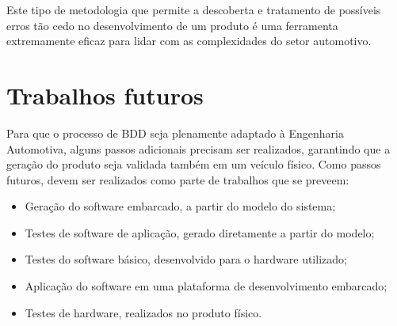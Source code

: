 Este tipo de metodologia que permite a descoberta e tratamento de possíveis erros tão cedo no desenvolvimento de um produto é uma ferramenta extremamente eficaz para 
lidar com as complexidades do setor automotivo.

\section{Trabalhos futuros}

Para que o processo de BDD seja plenamente adaptado à Engenharia Automotiva, alguns passos adicionais precisam ser realizados, garantindo que a geração do 
produto seja validada também em um veículo físico. 
Como passos futuros, devem ser realizados como parte de trabalhos que se preveem:

\begin{itemize} 
    \item Geração do software embarcado, a partir do modelo do sistema;
    \item Testes de software de aplicação, gerado diretamente a partir do modelo;
    \item Testes do software básico, desenvolvido para o hardware utilizado;
    \item Aplicação do software em uma plataforma de desenvolvimento embarcado;
    \item Testes de hardware, realizados no produto físico.
\end{itemize}
